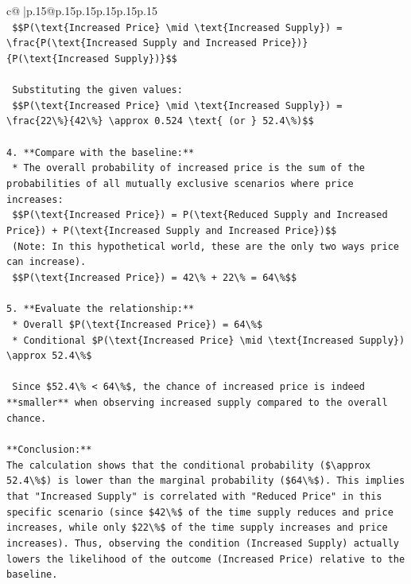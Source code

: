 \documentclass{article}
\begin{document}
{\begin{supertabular}{c@{$\;$}|p{.15\linewidth}@{}p{.15\linewidth}p{.15\linewidth}p{.15\linewidth}p{.15\linewidth}p{.15\linewidth}}
{{{\\ 
\texttt{    \$\$P(\textbackslash{}text\{Increased Price\} \textbackslash{}mid \textbackslash{}text\{Increased Supply\}) = \textbackslash{}frac\{P(\textbackslash{}text\{Increased Supply and Increased Price\})\}\{P(\textbackslash{}text\{Increased Supply\})\}\$\$} \\
\\ 
\texttt{    Substituting the given values:} \\
\texttt{    \$\$P(\textbackslash{}text\{Increased Price\} \textbackslash{}mid \textbackslash{}text\{Increased Supply\}) = \textbackslash{}frac\{22\textbackslash{}\%\}\{42\textbackslash{}\%\} \textbackslash{}approx 0.524 \textbackslash{}text\{ (or \} 52.4\textbackslash{}\%)\$\$} \\
\\ 
\texttt{4.  **Compare with the baseline:**} \\
\texttt{    *   The overall probability of increased price is the sum of the probabilities of all mutually exclusive scenarios where price increases:} \\
\texttt{        \$\$P(\textbackslash{}text\{Increased Price\}) = P(\textbackslash{}text\{Reduced Supply and Increased Price\}) + P(\textbackslash{}text\{Increased Supply and Increased Price\})\$\$} \\
\texttt{        (Note: In this hypothetical world, these are the only two ways price can increase).} \\
\texttt{        \$\$P(\textbackslash{}text\{Increased Price\}) = 42\textbackslash{}\% + 22\textbackslash{}\% = 64\textbackslash{}\%\$\$} \\
\\ 
\texttt{5.  **Evaluate the relationship:**} \\
\texttt{    *   Overall \$P(\textbackslash{}text\{Increased Price\}) = 64\textbackslash{}\%\$} \\
\texttt{    *   Conditional \$P(\textbackslash{}text\{Increased Price\} \textbackslash{}mid \textbackslash{}text\{Increased Supply\}) \textbackslash{}approx 52.4\textbackslash{}\%\$} \\
\\ 
\texttt{    Since \$52.4\textbackslash{}\% < 64\textbackslash{}\%\$, the chance of increased price is indeed **smaller** when observing increased supply compared to the overall chance.} \\
\\ 
\texttt{**Conclusion:**} \\
\texttt{The calculation shows that the conditional probability (\$\textbackslash{}approx 52.4\textbackslash{}\%\$) is lower than the marginal probability (\$64\textbackslash{}\%\$). This implies that "Increased Supply" is correlated with "Reduced Price" in this specific scenario (since \$42\textbackslash{}\%\$ of the time supply reduces and price increases, while only \$22\textbackslash{}\%\$ of the time supply increases and price increases). Thus, observing the condition (Increased Supply) actually lowers the likelihood of the outcome (Increased Price) relative to the baseline.} \\
}}}
\end{supertabular}}
\end{document}
